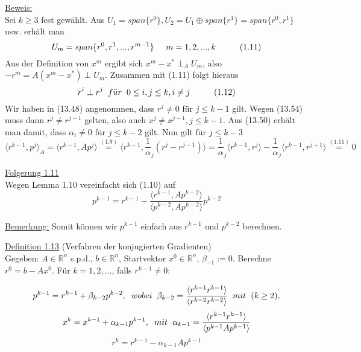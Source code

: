 \documentclass[a4paper]{letter}
\begin{document}
\underline{Beweis:}
\\Sei $k \ge 3$ fest gew\"ahlt. Aus $U_{1} = span\{r^{0}\}, U_{2} = U_{1} \oplus span\{r^{1}\} = span\{r^{0}, r^{1}\}$ usw. erh\"alt man
$$U_{m} = span\{r^{0}, r^{1},...,r^{m-1}\} \hspace{5mm} m = 1,2,...,k \hspace{10mm} (1.11)$$
Aus der Definition von $x^{m}$ ergibt sich $x^{m} - x^{*} \perp_{A} U_{m}$, also $-r^{m} = A(x^{m} - x^{*}) \perp U_{m}$. Zusammen mit (1.11) folgt hieraus
$$r^{i} \perp r^{j} \hspace{2mm} f\ddot{u}r \hspace{2mm} 0 \le i,j \le k, i \ne j \hspace{10mm} (1.12)$$
Wir haben in (13.48) angenommen, dass $r^{j} \ne 0$ f\"ur $j \le k-1$ gilt. Wegen (13.54) muss dann $r^{j} \ne r^{j-1}$ gelten, also auch $x^{j} \ne x^{j-1}, j \le k-1$. Aus (13.50) erh\"alt man damit,
dass $\alpha_{i} \ne 0$ f\"ur $j \le k-2$ gilt. Nun gilt f\"ur $j \le k-3$
$$\langle r^{k-1}, p^{j} \rangle _{A} =
\langle r^{k-1}, Ap^{j} \rangle \overset{(1.9)}{=} \langle r^{k-1}, {\frac 1 \alpha_{j} (r^{j} - r^{j-1})} \rangle =
\frac 1 \alpha_{j} \langle r^{k-1}, r^{j} \rangle - \frac 1 \alpha_{j} \langle r^{k-1}, r^{j+1} \rangle \overset{(1.11)}{=} 0$$

\underline{Folgerung 1.11}
\\Wegen Lemma 1.10 vereinfacht sich (1.10) auf
$$p^{k-1} = r^{k-1} - \frac {\langle r^{k-1}, Ap^{k-2} \rangle} {\langle p^{k-2}, Ap^{k-2} \rangle} p^{k-2}$$

\underline{Bemerkung:}
Somit k\"onnen wir $p^{k-1}$ einfach aus $r^{k-1}$ und $p^{k-2}$ berechnen.

\underline{Definition 1.13} (Verfahren der konjugierten Gradienten)
\\Gegeben: $A \in \mathbb{R}^{n}$ s.p.d., $b \in \mathbb{R}^{n}$, Startvektor $x^{0} \in \mathbb{R}^{n}$, $\beta_{-1} := 0$. Berechne $r^{0} = b - Ax^{0}$. F\"ur $k = 1,2,...$, falls $r^{k-1} \ne 0$:
\begin{Large}
\emph{
	$$p^{k-1} = r^{k-1} + \beta_{k-2}p^{k-2}, \hspace{2mm} wobei \hspace{2mm} \beta_{k-2} = \frac {\langle r^{k-1} r^{k-1} \rangle} {\langle r^{k-2} r^{k-2} \rangle} \hspace{2mm} mit \hspace{2mm} (k \ge 2),$$
	$$x^{k} = x^{k-1} + \alpha_{k-1}p^{k-1}, \hspace{2mm} mit \hspace{2mm} \alpha_{k-1} = \frac {\langle r^{k-1} r^{k-1} \rangle} {\langle p^{k-1} Ap^{k-1} \rangle}$$
	$$r^{k} = r^{k-1} - \alpha_{k-1}Ap^{k-1}$$
}
\end{Large}
\end{document}
